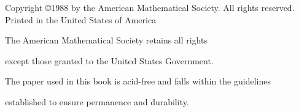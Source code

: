 \documentclass{surv-l}
\begin{document}
\begin{center}
Copyright \copyright 1988 by the American Mathematical Society. All rights reserved. Printed in the United States of America

The American Mathematical Society retains all rights

except those granted to the United States Government.


The paper used in this book is acid-free and falls within the guidelines

established to ensure permanence and durability. \circledinfty
\end{center}
\end{document}
